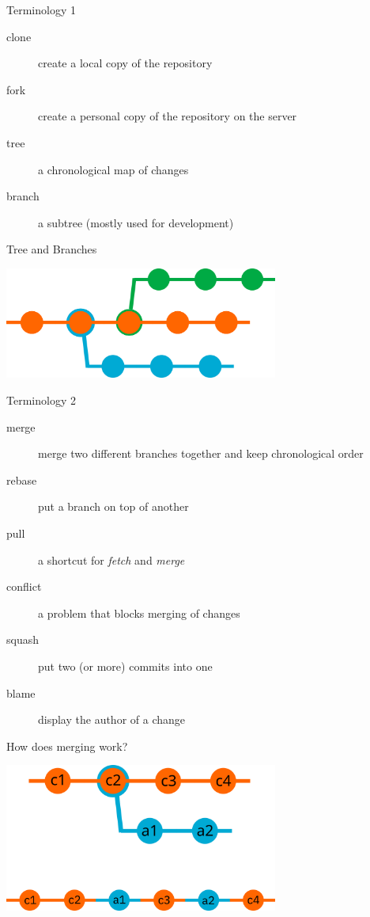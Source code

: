 \documentclass[14pt]{beamer}
\begin{document}
	\begin{frame}{Terminology 1}
	\begin{description}
		\item[clone] create a local copy of the repository
		\item[fork] create a personal copy of the repository on the server 
		\item[tree] a chronological map of changes
		\item[branch] a subtree (mostly used for development)
	\end{description}
	\end{frame}

	\begin{frame}{Tree and Branches}
    \begin{center}
	\includegraphics[width=9cm]{tree.png}
	\end{center}
	\end{frame}

	\begin{frame}{Terminology 2}
	\begin{description}
		\item[merge] merge two different branches together and keep chronological order
		\item[rebase] put a branch on top of another
		\item[pull] a shortcut for \textit{fetch} and \textit{merge}
		\item[conflict] a problem that blocks merging of changes
		\item[squash] put two (or more) commits into one
		\item[blame] display the author of a change
	\end{description}
	\end{frame}

	\begin{frame}{How does merging work?}
	\begin{center}
		\includegraphics[width=9cm]{merge.png}
	\end{center}
	\end{frame}
\end{document}

